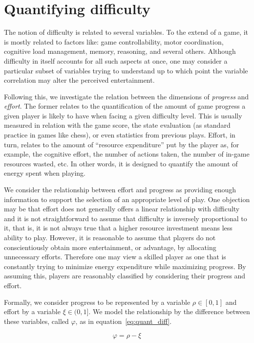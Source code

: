 \section{Quantifying difficulty}
The notion of difficulty is related to several variables. To the extend of a game, it is mostly related to factors like: game controllability, motor coordination, cognitive load management, memory, reasoning, and several others. Although difficulty in itself accounts for all such aspects at once, one may consider a particular subset of variables trying to understand up to which point the variable correlation may alter the perceived entertainment.

Following this, we investigate the relation between the dimensions of \textit{progress} and \textit{effort}. The former relates to the quantification of the amount of game progress a given player is likely to have when facing a given difficulty level. This is usually measured in relation with the game score, the state evaluation (as standard practice in games like chess), or even statistics from previous plays. Effort, in turn, relates to the amount of ``resource expenditure'' put by the player as, for example, the cognitive effort, the number of actions taken, the number of in-game resources wasted, etc. In other words, it is designed to quantify the amount of energy spent when playing.

We consider the relationship between effort and progress as providing enough information to support the selection of an appropriate level of play. One objection may be that effort does not generally offers a linear relationship with difficulty and it is not straightforward to assume that difficulty is inversely proportional to it, that is, it is not always true that a higher resource investment means less ability to play. However, it is reasonable to assume that players do not conscientiously obtain more entertainment, or advantage, by allocating unnecessary efforts. Therefore one may view a skilled player as one that is constantly trying to minimize energy expenditure while maximizing progress. By assuming this, players are reasonably classified by considering their progress and effort.

Formally, we consider progress to be represented by a variable $\rho \in [0, 1]$ and effort by a variable $\xi \in (0, 1]$. We model the relationship by the difference between these variables, called $\varphi$, as in equation~\ref{eq:quant_diff}.

\begin{equation}\label{eq:quant_diff}
    \varphi = \rho - \xi
\end{equation}\\

